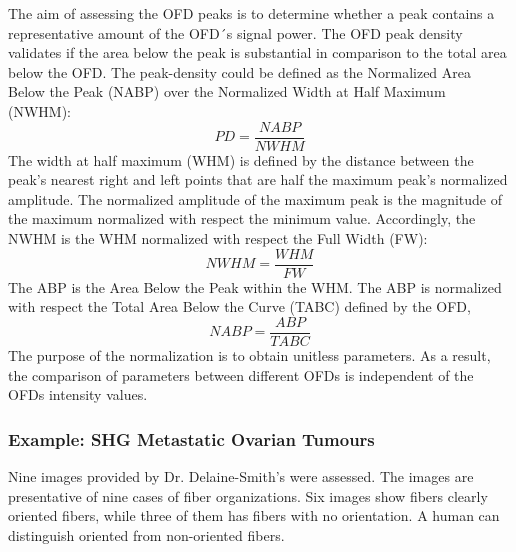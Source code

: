 \documentclass[12pt,a4paper]{article}
\begin{document}
The aim of assessing the OFD peaks is to determine whether a peak contains a representative amount of the OFD´s signal power. The OFD peak density validates if the area below the peak is substantial in comparison to the total area below the OFD.  The peak-density  could be defined as the Normalized Area Below the Peak (NABP) over the Normalized Width at Half Maximum (NWHM):
\begin{equation}
PD=\frac{NABP}{NWHM}
\end{equation}
The width at half maximum (WHM) is defined by the distance between the peak's nearest right and left points that are half the maximum peak's normalized amplitude. The normalized amplitude of the maximum peak is the magnitude of the maximum normalized with respect the minimum value.  Accordingly, the NWHM is the WHM normalized with respect the Full Width (FW):
\begin{equation}
NWHM=\frac{WHM}{FW}
\end{equation}
The ABP is the Area Below the Peak within the WHM. The ABP is normalized with respect the Total Area Below the Curve (TABC) defined by the OFD,
\begin{equation}
NABP=\frac{ABP}{TABC}
\end{equation}
The purpose of the normalization is to obtain unitless parameters. As a result, the comparison of parameters between different OFDs is independent of the OFDs intensity values.

\subsubsection{Example: SHG Metastatic Ovarian Tumours}
Nine images provided by Dr. Delaine-Smith’s were assessed. The images are presentative of nine cases of fiber organizations. Six images show fibers clearly oriented fibers, while three of them has fibers with no orientation. A human can distinguish oriented from non-oriented fibers. 
\end{document}
